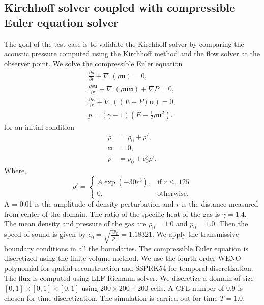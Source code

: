 \documentclass[a4paper]{article}
\begin{document}
\subsection{Kirchhoff solver coupled with compressible Euler equation solver}
The goal of the test case is to validate the Kirchhoff solver by comparing the acoustic pressure computed using the Kirchhoff method and the flow solver at the observer point. We solve the compressible Euler equation
\begin{align}
	\frac{\partial \rho}{\partial t} + \nabla . (\rho \mathbf{u}) = 0,                                  \\
	\frac{\partial \rho \mathbf{u}}{\partial t} + \nabla . (\rho \mathbf{u} \mathbf{u}) + \nabla P	 = 0, \\
	\frac{\partial E}{\partial t} + \nabla . ((E + P) \mathbf{u}) = 0,                                  \\
	p = (\gamma - 1)(E - \frac{1}{2}\rho \mathbf{u}^{2}).
\end{align}
for an initial condition
\begin{align*}
	\rho       & = \rho_{0} + \rho',       \\
	\mathbf{u} & = 0,                      \\
	p          & = p_{0} + c_{0}^{2}\rho'.
\end{align*}
Where,
\[
	\rho'=
	\begin{cases}
		A \exp({-30r^{3}}), & \text{if } r\leq .125 \\
		0,                  & \text{otherwise}.
	\end{cases}
\]A = 0.01 is the amplitude of density perturbation and $r$ is the distance measured from center of the domain.
The ratio of the specific heat of the gas is $\gamma = 1.4$. The mean density and pressure of the gas are $\rho_{0} = 1.0$ and $p_{0} = 1.0$.
Then the speed of sound is given by $c_{0}= \sqrt{\frac{\gamma p_{0}}{\rho_{0}}} = 1.18321$.
We apply the transmissive boundary conditions in all the boundaries.
The compressible Euler equation is discretized using the finite-volume method.
We use the fourth-order WENO polynomial for spatial reconstruction
and SSPRK54 for temporal discretization. The flux is computed using LLF Riemann solver.
We discretize a domain of size $[0, 1] \times [0, 1] \times [0, 1]$  using $200 \times 200 \times 200$ cells. A CFL number of 0.9 is chosen for time discretization. The simulation is carried out for time $T = 1.0$.
\end{document}
